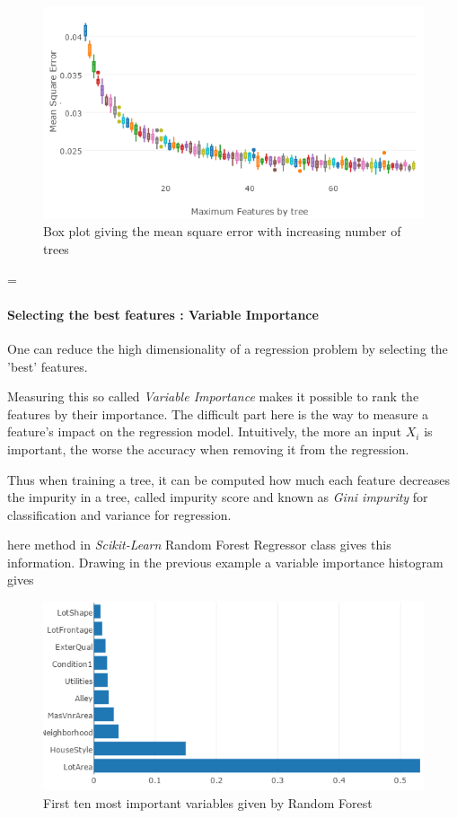 \documentclass[english,11pt,openany]{article}
\theoremstyle{definition}
\theoremstyle{plain}
\theoremstyle{definition}
\begin{document}
\begin{appendices}
		
		
		\begin{figure}[H]
			\label{figure:timing_features}
			\includegraphics[scale=0.8]{RF_analysis/mse_features.png} 
			\caption{Box plot giving the mean square error with increasing number of trees}
		\end{figure}
		=
		
		\paragraph{Selecting the best features : Variable Importance}
		
		One can reduce the high dimensionality of a regression problem by selecting the 'best' features.
		
		Measuring this so called \textit{Variable Importance} makes it possible to rank the features by their importance. The difficult part here is the way to measure a feature's impact on the regression model. 
		Intuitively, the more an input $X_i$ is important, the worse the accuracy when removing it from the regression. 
		
		Thus when training a tree, it can be computed how much each feature decreases the impurity in a tree, called impurity score and known as \textit{Gini impurity} for classification and variance for regression.
		
		here method in \textit{Scikit-Learn} Random Forest Regressor class gives this information. 
		Drawing in the previous example a variable importance histogram gives
		
		\begin{figure}[H]
			\label{figure:vi}
			\includegraphics[scale=0.6]{RF_analysis/vi.png} 
			\caption{First ten most important variables given by Random Forest}
		\end{figure}
		

\end{appendices}
\end{document}

